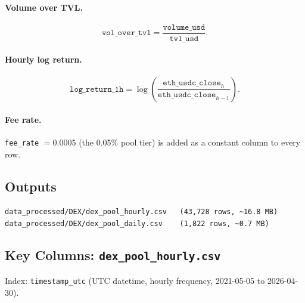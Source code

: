 \documentclass[11pt,a4paper]{article}
\begin{document}
\paragraph{Volume over TVL.}
\[
  \texttt{vol\_over\_tvl} = \frac{\texttt{volume\_usd}}{\texttt{tvl\_usd}}.
\]

\paragraph{Hourly log return.}
\[
  \texttt{log\_return\_1h} = \log\!\left(\frac{\texttt{eth\_usdc\_close}_h}
  {\texttt{eth\_usdc\_close}_{h-1}}\right).
\]

\paragraph{Fee rate.}
\texttt{fee\_rate} $= 0.0005$ (the 0.05\% pool tier) is added as a
constant column to every row.

\subsection{Outputs}

\begin{lstlisting}
data_processed/DEX/dex_pool_hourly.csv   (43,728 rows, ~16.8 MB)
data_processed/DEX/dex_pool_daily.csv    (1,822 rows, ~0.7 MB)
\end{lstlisting}

\subsection{Key Columns: \texttt{dex\_pool\_hourly.csv}}

Index: \texttt{timestamp\_utc} (UTC datetime, hourly frequency,
2021-05-05 to 2026-04-30).
\end{document}
